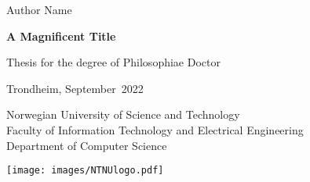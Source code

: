\documentclass[../main.tex]{subfiles}
\begin{document}
\frontmatter
{
\sffamily
\parindent=0cm
\renewcommand{\headrulewidth}{0pt}
\addtolength{\parskip}{\baselineskip}
{\huge {Author Name}}
\vspace{2cm}

{\textbf {\fontsize{27}{32}\selectfont A Magnificent Title}}

{\LARGE }
\vspace{5cm}

{\Large Thesis for the degree of Philosophiae Doctor

Trondheim, September\ 2022

Norwegian University of Science and Technology \\
Faculty of Information Technology and Electrical Engineering \\
Department of Computer Science}
\vspace{5cm}

\texttt{[image: images/NTNUlogo.pdf]}

\newpage
}
\end{document}

